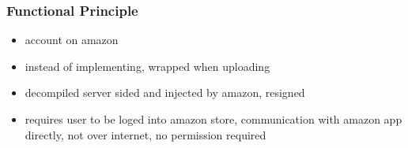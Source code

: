 \subsubsection{Functional Principle}\label{section:license-amazon-functional}
\begin{itemize}
  \item account on amazon
  \item instead of implementing, wrapped when uploading
  \item decompiled server sided and injected by amazon, resigned
  \item requires user to be loged into amazon store, communication with amazon app directly, not over internet, no permission required
\end{itemize}

